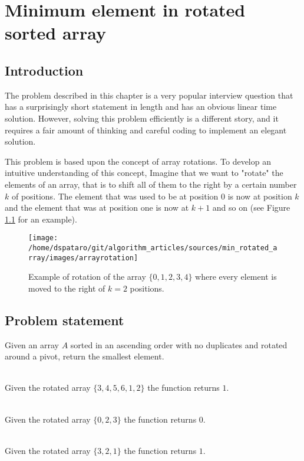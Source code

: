 %

\chapter{Minimum element in rotated sorted array}
\label{ch:min_rotated_array}
\section*{Introduction}
The problem described in this chapter is a very popular interview question that has a surprisingly short statement in length and has an obvious linear time solution. However, solving this problem efficiently is a different story, and it requires a fair amount of thinking and careful coding to implement an elegant solution.

This problem is based upon the concept of array rotations. To develop an intuitive understanding of this concept, Imagine that we want to "rotate" the elements of an array, that is to shift all of them to the right by a certain number $k$ of positions. The element that was used to be at position $0$ is now at position $k$ and the element that was at position one is now at $k+1$ and so on (see Figure \ref{fig:min_rotated_array:arrayrotation} for an example).

\begin{figure}
	\centering
	\texttt{[image: /home/dspataro/git/algorithm\_articles/sources/min\_rotated\_array/images/arrayrotation]}
	\caption{Example of rotation of the array  $\{0,1,2,3,4\}$ where every element is moved to the right of $k=2$ positions.}
	\label{fig:min_rotated_array:arrayrotation}
\end{figure}


\section{Problem statement}
\begin{exercise}
Given an array $A$ sorted in an ascending order with no duplicates and rotated around a pivot, return the smallest element.

	\begin{example}
		\hfill \\
		Given the rotated array $\{3,4,5,6,1,2\}$ the function returns $1$.
	\end{example}

	\begin{example}
		\hfill \\
		Given the rotated array $\{0,2,3\}$ the function returns $0$.
	\end{example}

	\begin{example}
		\hfill \\
		Given the rotated array $\{3,2,1\}$ the function returns $1$.
	\end{example}
\end{exercise}


